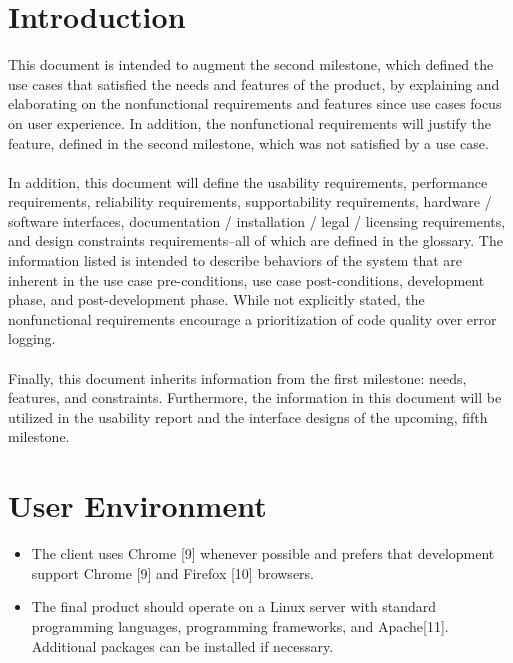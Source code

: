 \documentclass{article}
\begin{document}
\section{Introduction}
This document is intended to augment the second milestone, which defined the use cases that satisfied the needs and features of the product, by explaining and elaborating on the nonfunctional requirements and features since use cases focus on user experience.  In addition, the nonfunctional requirements will justify the feature, defined in the second milestone, which was not satisfied by a use case.\\
~\\
In addition, this document will define the usability requirements, performance requirements, reliability requirements, supportability requirements, hardware / software interfaces, documentation / installation / legal / licensing requirements, and design constraints requirements--all of which are defined in the glossary.  The information listed is intended to describe behaviors of the system that are inherent in the use case pre-conditions, use case post-conditions, development phase, and post-development phase.  While not explicitly stated, the nonfunctional requirements encourage a prioritization of code quality over error logging.\\
~\\
Finally, this document inherits information from the first milestone:  needs, features, and constraints.  Furthermore, the information in this document will be utilized in the usability report and the interface designs of the upcoming, fifth milestone.

\section{User Environment}
\begin{itemize}
\item The client uses Chrome [9] whenever possible and prefers that development support Chrome [9] and Firefox [10] browsers.
\item The final product should operate on a Linux server with standard programming languages, programming frameworks, and Apache[11].  Additional packages can be installed if necessary.
\end{itemize}
\end{document}
